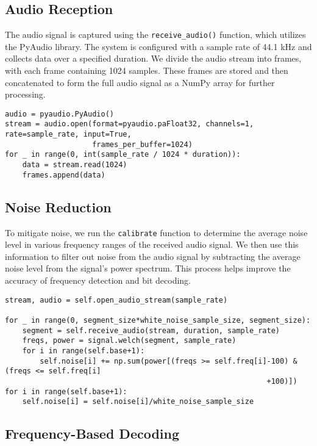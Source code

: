 \documentclass[11pt]{article}
\begin{document}
\subsection{Audio Reception}
The audio signal is captured using the \texttt{receive\_audio()} function, which utilizes the PyAudio library. The system is configured with a sample rate of 44.1 kHz and collects data over a specified duration. We divide the audio stream into frames, with each frame containing 1024 samples. These frames are stored and then concatenated to form the full audio signal as a NumPy array for further processing.
\begin{tcolorbox}[colback=black!10!white, colframe=black]
\begin{verbatim}
audio = pyaudio.PyAudio()
stream = audio.open(format=pyaudio.paFloat32, channels=1, rate=sample_rate, input=True, 
                    frames_per_buffer=1024)
for _ in range(0, int(sample_rate / 1024 * duration)): 
    data = stream.read(1024) 
    frames.append(data)
\end{verbatim}
\end{tcolorbox}
\subsection{Noise Reduction}
To mitigate noise, we run the \texttt{calibrate} function to determine the average noise level in various frequency ranges of the received audio signal. We then use this information to filter out noise from the audio signal by subtracting the average noise level from the signal's power spectrum. This process helps improve the accuracy of frequency detection and bit decoding.
\begin{tcolorbox}[colback=black!10!white, colframe=black]
\begin{verbatim}
stream, audio = self.open_audio_stream(sample_rate)

for _ in range(0, segment_size*white_noise_sample_size, segment_size):
    segment = self.receive_audio(stream, duration, sample_rate)
    freqs, power = signal.welch(segment, sample_rate)
    for i in range(self.base+1):
        self.noise[i] += np.sum(power[(freqs >= self.freq[i]-100) & (freqs <= self.freq[i]
                                                            +100)])
for i in range(self.base+1):
    self.noise[i] = self.noise[i]/white_noise_sample_size
\end{verbatim}
\end{tcolorbox}

\subsection{Frequency-Based Decoding}
\end{document}
